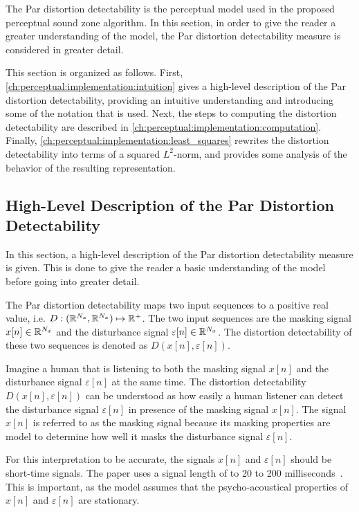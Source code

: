 The Par distortion detectability is the perceptual model used in the proposed perceptual sound zone algorithm.
In this section, in order to give the reader a greater understanding of the model, 
the Par distortion detectability measure is considered in greater detail.

This section is organized as follows.
First, \autoref{ch:perceptual:implementation:intuition} gives a high-level description of the 
Par distortion detectability, providing an intuitive understanding and introducing some of the notation that is used.
Next, the steps to computing the distortion detectability are described in 
\autoref{ch:perceptual:implementation:computation}.
Finally, \autoref{ch:perceptual:implementation:least_squares} rewrites the distortion detectability into terms of a 
squared $L^2$-norm, and provides some analysis of the behavior of the resulting representation.

\subsection{High-Level Description of the Par Distortion Detectability}
\label{ch:perceptual:implementation:intuition}
In this section, a high-level description of the Par distortion detectability measure is given.
This is done to give the reader a basic understanding of the model before going into greater detail.

The Par distortion detectability maps two input sequences to a positive real value, 
i.e. $D: (\mathbb{R}^{N_x}, \mathbb{R}^{N_x})\mapsto \mathbb{R}^{+}$.
The two input sequences are the masking signal $x[n]\in\mathbb{R}^{N_x}$ and the disturbance signal $\varepsilon[n]\in\mathbb{R}^{N_x}$.
The distortion detectability of these two sequences is denoted as $D(x[n], \varepsilon[n])$. 

Imagine a human that is listening to both the masking signal $x[n]$ and the disturbance signal $\varepsilon[n]$ 
at the same time.
The distortion detectability $D(x[n], \varepsilon[n])$ can be understood as how easily a human listener can 
detect the disturbance signal $\varepsilon[n]$ in presence of the masking signal $x[n]$.
The signal $x[n]$ is referred to as the masking signal because its masking properties are model to 
determine how well it masks the disturbance signal $\varepsilon[n]$.

For this interpretation to be accurate, the signals $x[n]$ and $\varepsilon[n]$ should be short-time signals.
The paper uses a signal length of to 20 to 200 milliseconds~\cite{van2005perceptual}.    
This is important, as the model assumes that the psycho-acoustical properties of $x[n]$ 
and $\varepsilon[n]$ are stationary.  

